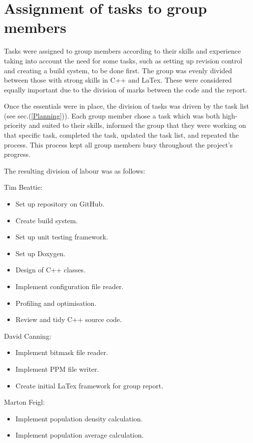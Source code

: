 \section{Assignment of tasks to group members}
\label{Assignment of tasks to group members}

Tasks were assigned to group members according to their skills and experience taking into account the need for some tasks, such as setting up revision control and creating a build system, to be done first.  
The group was evenly divided between those with strong skills in C++ and LaTex.  
These were considered equally important due to the division of marks between the code and the report.

Once the essentials were in place, the division of tasks was driven by the task list (see sec.(\ref{Planning})).  
Each group member chose a task which was both high-priority and suited to their skills, informed the group that they were working on that specific task, completed the task, updated the task list, and repeated the process.  
This process kept all group members busy throughout the project's progress.

The resulting division of labour was as follows:

Tim Beattie:
\begin{itemize}
	\item Set up repository on GitHub.
	\item Create build system.
	\item Set up unit testing framework.
	\item Set up Doxygen.
	\item Design of C++ classes.
	\item Implement configuration file reader.
	\item Profiling and optimisation.
	\item Review and tidy C++ source code.
\end{itemize}

David Canning:
\begin{itemize}
	\item Implement bitmask file reader.
	\item Implement PPM file writer.
	\item Create initial LaTex framework for group report.
\end{itemize}

Marton Feigl:
\begin{itemize}
	\item Implement population density calculation.
	\item Implement population average calculation.
\end{itemize}

